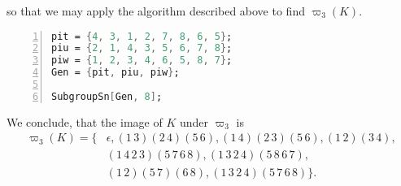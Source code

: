 so that we may apply the algorithm described above to find $\varpi_3(K)$.
\begin{lstlisting}[language=Mathematica, numbers=left, numberstyle=\tiny, stepnumber=2, numbersep=5pt]
pit = {4, 3, 1, 2, 7, 8, 6, 5};
piu = {2, 1, 4, 3, 5, 6, 7, 8};
piw = {1, 2, 3, 4, 6, 5, 8, 7};
Gen = {pit, piu, piw};

SubgroupSn[Gen, 8];
\end{lstlisting}
We conclude, that the image of $K$ under $\varpi_3$ is
\begin{align*}
\varpi_3(K)=\lbrace	&\epsilon,(1\, 3)(2\, 4)(5\, 6), (1\, 4)(2\, 3)(5\, 6), (1\, 2)(3\, 4),   \\
									&(1\, 4\, 2\, 3)(5\, 7\, 6\, 8), (1\, 3\, 2\, 4)(5\, 8\, 6\, 7), \\
									&(1\, 2)(5\, 7)(6\, 8),   (1\, 3\, 2\, 4)(5\, 7\, 6\, 8)\rbrace.
\end{align*}